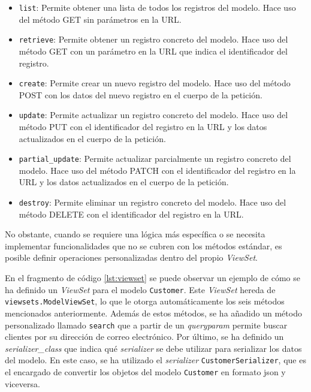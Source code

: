 \begin{itemize}
    \item \texttt{list}: Permite obtener una lista de todos los registros del modelo. Hace uso del método GET sin parámetros en la URL.
    \item \texttt{retrieve}: Permite obtener un registro concreto del modelo. Hace uso del método GET con un parámetro en la URL que indica el identificador del registro.
    \item \texttt{create}: Permite crear un nuevo registro del modelo. Hace uso del método POST con los datos del nuevo registro en el cuerpo de la petición.
    \item \texttt{update}: Permite actualizar un registro concreto del modelo. Hace uso del método PUT con el identificador del registro en la URL y los datos actualizados en el cuerpo de la petición.
    \item \texttt{partial\_update}: Permite actualizar parcialmente un registro concreto del modelo. Hace uso del método PATCH con el identificador del registro en la URL y los datos actualizados en el cuerpo de la petición.
    \item \texttt{destroy}: Permite eliminar un registro concreto del modelo. Hace uso del método DELETE con el identificador del registro en la URL.
\end{itemize}

No obstante, cuando se requiere una lógica más específica o se necesita implementar funcionalidades que no se cubren con los métodos estándar, es posible definir operaciones personalizadas dentro del propio \textit{ViewSet}.

En el fragmento de código \ref{lst:viewset} se puede observar un ejemplo de cómo se ha definido un \textit{ViewSet} para el modelo \texttt{Customer}. Este \textit{ViewSet} hereda de \texttt{viewsets.ModelViewSet}, lo que le otorga automáticamente los seis métodos mencionados anteriormente. Además de estos métodos, se ha añadido un método personalizado llamado \texttt{search} que a partir de un \textit{queryparam} permite buscar clientes por su dirección de correo electrónico. Por último, se ha definido un \textit{serializer\_class} que indica qué \textit{serializer} se debe utilizar para serializar los datos del modelo. En este caso, se ha utilizado el \textit{serializer} \texttt{CustomerSerializer}, que es el encargado de convertir los objetos del modelo \texttt{Customer} en formato \gls{json} y viceversa.

\begin{center}
    \begin{minipage}{0.8\textwidth}
        
    \end{minipage}
\end{center}

